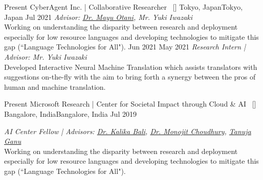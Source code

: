 
\begin{experiences}
\researchexperience
    {Present}   {CyberAgent Inc. | Collaborative Researcher{\normalfont  ~ [\href{https://www.cyberagent.co.jp/news/detail/id=26231}{\small{\websiteSymbol}}]
    }}{Tokyo, Japan}{Tokyo, Japan}
    {Jul 2021} {\textit{Advisor: \href{https://mayu-ot.github.io/}{Dr. Mayu Otani}, {Mr. Yuki Iwazaki}}\\
    Working on understanding the disparity between research and deployment especially for low resource languages and developing technologies to mitigate this gap (``Language Technologies for All").
    \vskip 0.1cm
    }
\researchexperience
    {Jun 2021}   {}{}{}
    {May 2021} {\textit{Research Intern | Advisor: {Mr. Yuki Iwazaki}
    }\\
    Developed Interactive Neural Machine Translation which assists translators with suggestions on-the-fly with the aim to bring forth a synergy between the pros of human and machine translation.
    }

\emptySeparator
\researchexperience
    {Present}   {Microsoft Research | Center for Societal Impact through Cloud \& AI{\normalfont  ~ [\href{https://www.microsoft.com/en-us/research/collaboration/scai/}{\small{\websiteSymbol}}]
    }}{Bangalore, India}{Bangalore, India}
    {Jul 2019} {\textit{AI Center Fellow | Advisors:  \href{https://www.microsoft.com/en-us/research/people/kalikab/}{Dr. Kalika Bali}, \href{https://www.microsoft.com/en-us/research/people/monojitc/}{Dr. Monojit Choudhury}, \href{https://www.microsoft.com/en-us/research/people/taganu/}{Tanuja Ganu}}\\
    Working on understanding the disparity between research and deployment especially for low resource languages and developing technologies to mitigate this gap (``Language Technologies for All").
    \vskip 0.1cm

}
\end{experiences}
